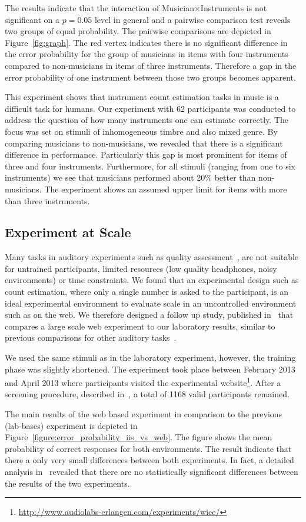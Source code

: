 The results indicate that the interaction of Musician$\times$Instruments is not significant on a $p=0.05$ level in general and a pairwise comparison test reveals two groups of equal probability. The pairwise comparisons are depicted in Figure~\ref{fig:graph}. The red vertex indicates there is no significant difference in the error probability for the group of musicians in items with four instruments compared to non-musicians in items of three instruments. Therefore a gap in the error probability of one instrument between those two groups becomes apparent.
\par
This experiment shows that instrument count estimation tasks in music is a difficult task for humans. Our experiment with 62 participants was conducted to address the question of how many instruments one can estimate correctly.
The focus was set on stimuli of inhomogeneous timbre and also mixed genre. By comparing musicians to non-musicians, we revealed that there is a significant difference in performance. Particularly this gap is most prominent for items of three and four instruments. Furthermore, for all stimuli (ranging from one to six instruments) we see that musicians performed about 20\% better than non-musicians. The experiment shows an assumed upper limit for items with more than three instruments.

\subsection{Experiment at Scale}

Many tasks in auditory experiments such as quality assessment~\cite{recommendation2001MUSHRA}, are not suitable for untrained participants, limited resources (low quality headphones, noisy environments) or time constraints.
We found that an experimental design such as count estimation, where only a single number is asked to the participant, is an ideal experimental environment to evaluate scale in an uncontrolled environment such as on the web.
We therefore designed a follow up study, published in~\cite{schoeffler13} that compares a large scale web experiment to our  laboratory results, similar to previous comparisons for other auditory tasks~\cite{Welch1996, lee2010, Salganik2006, Reips2012}.
\par
We used the same stimuli as in the laboratory experiment, however, the training phase was slightly shortened.
The experiment took place between February 2013 and April 2013 where participants visited the experimental website\footnote{{\scriptsize\url{http://www.audiolabs-erlangen.com/experiments/wice/}}}.
After a screening procedure, described in~\cite{schoeffler13}, a total of 1168 valid participants remained.
\par
The main results of the web based experiment in comparison to the previous (lab-bases) experiment is depicted in Figure~\ref{figure:error_probability_iis_vs_web}.
The figure shows the mean probability of correct responses for both environments.
The result indicate that there a only very small differences between both experiments. 
In fact, a detailed analysis in~\cite{schoeffler13} revealed that there are no statistically significant differences between the results of the two experiments. 

